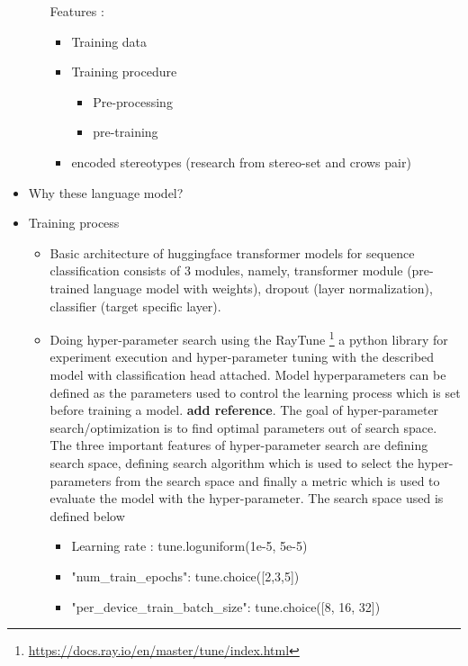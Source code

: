 \begin{itemize}
\begin{itemize}
            Features :
            \begin{itemize}
                \item Training data 
                \item Training procedure
                \begin{itemize}
                    \item Pre-processing
                    \item pre-training
                \end{itemize}
                \item encoded stereotypes (research from stereo-set and crows pair)
            \end{itemize}
    \end{itemize}
    \item Why these language model?
    \item Training process
        \begin{itemize}
            \item Basic architecture of huggingface transformer models for sequence classification consists of 3 modules, namely, transformer module (pre-trained language model with weights), dropout (layer normalization), classifier (target specific layer). 
            \item  Doing hyper-parameter search using the RayTune \footnote{\url{https://docs.ray.io/en/master/tune/index.html}} a python library for experiment execution and hyper-parameter tuning with the described model with classification head attached. Model hyperparameters can be defined as the parameters used to control the learning process which is set before training a model. \cite{bergstra2012random}\textbf{add reference}.  The goal of hyper-parameter search/optimization is to find optimal parameters out of search space. The three important features of hyper-parameter search are defining search space, defining search algorithm which is used to select the hyper-parameters from the search space and finally a metric which is used to evaluate the model with the hyper-parameter. The search space used is defined below 
            \begin{itemize}
                \item Learning rate : tune.loguniform(1e-5, 5e-5)
                \item "num\_train\_epochs": tune.choice([2,3,5])
                \item "per\_device\_train\_batch\_size": tune.choice([8, 16, 32])
            \end{itemize}
            

\end{itemize}
\end{itemize}
